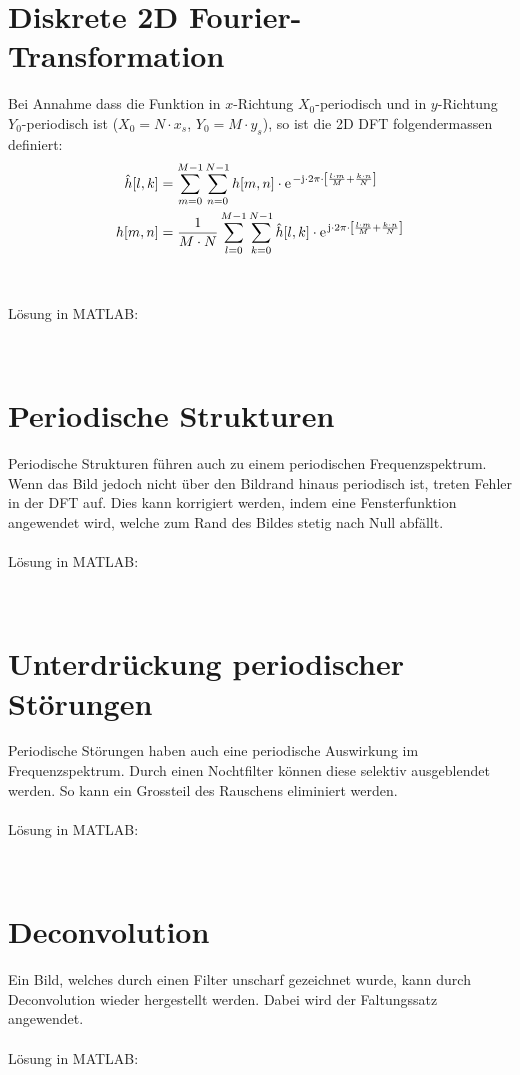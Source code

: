 \section{Diskrete 2D Fourier-Transformation}
Bei Annahme dass die Funktion in $x$-Richtung $X_0$-periodisch und in $y$-Richtung $Y_0$-periodisch ist ($X_0 = N \cdot x_s$, $Y_0 = M \cdot y_s$), so ist die 2D DFT folgendermassen definiert:
\[\begin{aligned}
	\hat{h}[l,k] &= \sum_{m=0}^{M-1} \sum_{n=0}^{N-1} h[m,n] \cdot \mathrm{e\;\!}^{-\mathrm{j} \cdot 2\pi \cdot \left[\frac{l \cdot m}{M} + \frac{k \cdot n}{N}\right]}
	\\
	h[m,n] &= \frac{1}{M \cdot N} \sum_{l=0}^{M-1} \sum_{k=0}^{N-1} \hat{h}[l,k] \cdot \mathrm{e\;\!}^{\mathrm{j} \cdot 2\pi \cdot \left[\frac{l \cdot m}{M} + \frac{k \cdot n}{N}\right]}
\end{aligned}\]
~\\\\
Lösung in MATLAB:
\lstset{language=Matlab}

~\\

\section{Periodische Strukturen}
Periodische Strukturen führen auch zu einem periodischen Frequenzspektrum.
Wenn das Bild jedoch nicht über den Bildrand hinaus periodisch ist, treten Fehler in der DFT auf.
Dies kann korrigiert werden, indem eine Fensterfunktion angewendet wird, welche zum Rand des Bildes stetig nach Null abfällt.
~\\\\
Lösung in MATLAB:
\lstset{language=Matlab}

~\\

\section{Unterdrückung periodischer Störungen}
Periodische Störungen haben auch eine periodische Auswirkung im Frequenzspektrum.
Durch einen Nochtfilter können diese selektiv ausgeblendet werden. So kann ein Grossteil des Rauschens eliminiert werden.
~\\\\
Lösung in MATLAB:
\lstset{language=Matlab}

~\\

\section{Deconvolution}
Ein Bild, welches durch einen Filter unscharf gezeichnet wurde, kann durch Deconvolution wieder hergestellt werden. Dabei wird der Faltungssatz angewendet.
~\\\\
Lösung in MATLAB:
\lstset{language=Matlab}

~\\
